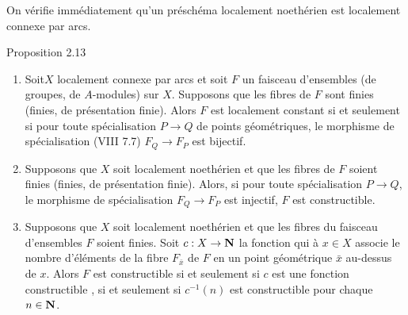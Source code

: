 \documentclass[10pt]{../fichiers-configuration-latex/smfart}
\begin{document}
On vérifie immédiatement qu'un préschéma localement noethérien est
localement connexe par arcs.

\begin{enonce*}{Proposition 2.13}
\begin{enumerate}
\renewcommand{\theenumi}{\roman{enumi}}
\renewcommand{\labelenumi}{(\theenumi)}
\item Soit\pageoriginale $X$ localement connexe par arcs et soit $F$
un faisceau d'ensembles (\resp de groupes, \resp de $A$-modules) sur
$X$. Supposons que les fibres de $F$ sont finies (\resp finies, \resp
de présentation finie). Alors $F$ est localement constant si et
seulement si pour toute spécialisation $P\rightarrow Q$ de points
géométriques, le morphisme de spécialisation {\rm (VIII 7.7)}
$F_Q\rightarrow F_P$ est bijectif.

\item Supposons que $X$ soit localement noethérien et que les fibres
de $F$ soient finies (\resp finies, \resp de présentation
finie). Alors, si pour toute spécialisation $P\rightarrow Q$, le
morphisme de spécialisation $F_Q\rightarrow F_P$ est injectif, $F$ est
constructible.

\item Supposons que $X$ soit localement noethérien et que les fibres
du faisceau d'ensembles $F$ soient finies. Soit $c:X\rightarrow
\mathbf{N}$ la fonction qui à $x\in X$ associe le nombre
d'éléments de la fibre $F_{\bar{x}}$ de $F$ en un point géométrique
$\bar{x}$ au-dessus de $x$. Alors $F$ est constructible si et seulement
si $c$ est une fonction constructible \ie, si et seulement si
$c^{-1}(n)$ est constructible pour chaque $n\in \mathbf{N}$.
\end{enumerate}
\end{enonce*}
\end{document}
